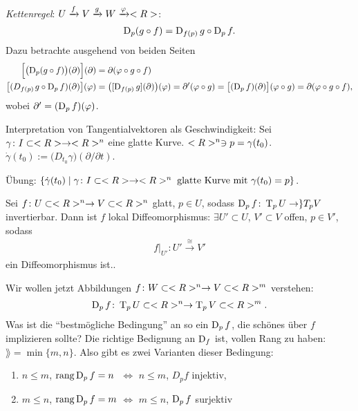 \emph{Kettenregel}: $U\xrightarrow{f} V\xrightarrow{g} W\xrightarrow{\varphi}<R>$: \begin{align*}
	\operatorname{D}_p(g\circ f) = \operatorname{D}_{f(p)} g\circ \operatorname{D}_p f.
\end{align*}
Dazu betrachte ausgehend von beiden Seiten \begin{align*}
	\Big[ \big(\!\operatorname{D}_p (g\circ f)\big)(\partial)\Big](\partial) &= \partial(\varphi\circ g\circ f) \\
	\big[( D_{f(p)}\mskip2mu g\circ \operatorname{D}_p f)(\partial)\big](\varphi) &= \big( [\operatorname{D}_{f(p)} g](\partial)\big)(\varphi) = \partial'(\varphi\circ g) = \big[ (\operatorname{D}_p f)(\partial)\big](\varphi\circ g) = \partial(\varphi\circ g\circ f),
\end{align*}
wobei $\partial' = (\operatorname{D}_p f)(\varphi)$.

Interpretation von Tangentialvektoren als Geschwindigkeit: Sei $\gamma\colon I\subset <R> \to <R>^n$ eine glatte Kurve. $<R>^n\ni p=\gamma(t_0)$. $\dot \gamma(t_0) := \big(D_{t_0} \gamma\big)(\partial\slash\partial t)$.

Übung: $\{ \dot\gamma(t_0)\mid \gamma\colon I\subset <R>\to <R>^n\;\text{glatte Kurve mit $\gamma(t_0)=p$} \}$.

\begin{proposition}
	Sei $f\colon U\subset <R>^n\to V\subset <R>^n$ glatt, $p\in U$, sodass $\operatorname{D}_p f\colon \operatorname{T}_p U\to \}T_p V$ invertierbar. Dann ist $f$ lokal Diffeomorphismus: $\exists U'\subset U$, $V'\subset V$ offen, $p\in V'$, sodass \begin{align*}
		f\big|_{U'}\colon U'\xrightarrow{\cong} V'
	\end{align*}
	ein Diffeomorphismus ist..
\end{proposition}

Wir wollen jetzt Abbildungen $f\colon W\subset <R>^n\to V\subset <R>^m$ verstehen: \begin{align*}
		\operatorname{D}_p f\colon \operatorname{T}_p U\subset <R>^n\to \operatorname{T}_p V\subset <R>^m.
\end{align*}
Was ist die "`bestmögliche Bedingung"' an so ein $\operatorname{D}_p f$, die schönes über $f$ implizieren sollte? Die richtige Bedignung an $\operatorname{D}_f$ ist, vollen Rang zu haben: $\rang = \min\{m,n\}$. Also gibt es zwei Varianten dieser Bedingung: \begin{enumerate}[label={(\arabic*)}]
	\item $n\le m$, $\operatorname{rang} \operatorname{D}_p f = n\;$ $\Leftrightarrow$ $n\le m$, $D_p f$ injektiv,
	\item $m\le n$, $\operatorname{rang} \operatorname{D}_p f = m$ $\Leftrightarrow$ $m\le n$, $\operatorname{D}_p f$ surjektiv
\end{enumerate}

